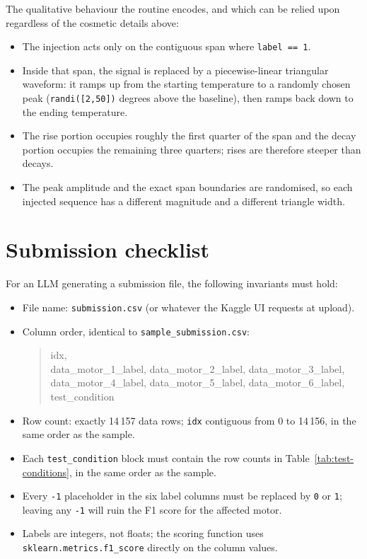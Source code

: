 \documentclass[11pt,a4paper]{article}
\begin{document}
The qualitative behaviour the routine encodes, and which can be relied upon
regardless of the cosmetic details above:

\begin{itemize}[leftmargin=1.4em]
  \item The injection acts only on the contiguous span where
        \texttt{label == 1}.
  \item Inside that span, the signal is replaced by a piecewise-linear
        triangular waveform: it ramps up from the starting temperature to a
        randomly chosen peak (\texttt{randi([2,50])} degrees above the
        baseline), then ramps back down to the ending temperature.
  \item The rise portion occupies roughly the first quarter of the span and
        the decay portion occupies the remaining three quarters; rises are
        therefore steeper than decays.
  \item The peak amplitude and the exact span boundaries are randomised, so
        each injected sequence has a different magnitude and a different
        triangle width.
\end{itemize}

\section{Submission checklist}
\label{sec:checklist}

For an LLM generating a submission file, the following invariants must hold:

\begin{itemize}[leftmargin=1.4em]
  \item File name: \texttt{submission.csv} (or whatever the Kaggle UI requests
        at upload).
  \item Column order, identical to \texttt{sample\_submission.csv}:
        \begin{quote}
        \ttfamily idx,\\
        data\_motor\_1\_label, data\_motor\_2\_label, data\_motor\_3\_label,\\
        data\_motor\_4\_label, data\_motor\_5\_label, data\_motor\_6\_label,\\
        test\_condition
        \end{quote}
  \item Row count: exactly 14\,157 data rows; \texttt{idx} contiguous from
        0 to 14\,156, in the same order as the sample.
  \item Each \texttt{test\_condition} block must contain the row counts in
        Table~\ref{tab:test-conditions}, in the same order as the sample.
  \item Every \texttt{-1} placeholder in the six label columns must be
        replaced by \texttt{0} or \texttt{1}; leaving any \texttt{-1} will
        ruin the F1 score for the affected motor.
  \item Labels are integers, not floats; the scoring function uses
        \texttt{sklearn.metrics.f1\_score} directly on the column values.
\end{itemize}
\end{document}
